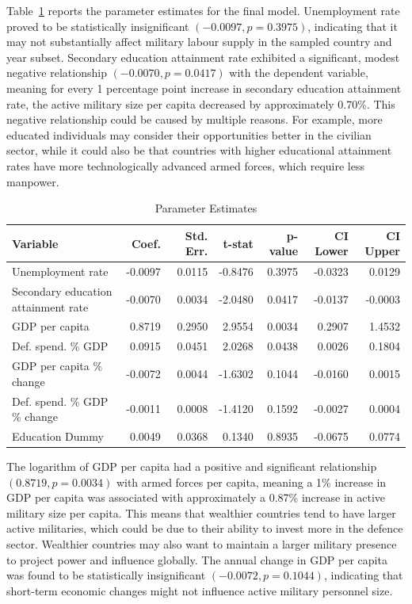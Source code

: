 Table~\ref{tab:final_model} reports the parameter estimates for the final model. 
Unemployment rate proved to be statistically insignificant $(-0.0097, p=0.3975)$, indicating that it may not substantially affect military labour supply in the sampled country and year subset.
Secondary education attainment rate exhibited a significant, modest negative relationship $(-0.0070, p=0.0417)$ with the dependent variable, meaning for every 1 percentage point increase in secondary education attainment rate, the active military size per capita decreased by approximately 0.70\%.
This negative relationship could be caused by multiple reasons. For example, more educated individuals may consider their opportunities better in the civilian sector, while it could also be that countries with higher educational attainment rates have more technologically advanced armed forces, which require less manpower.

\begin{table}[htbp]
\caption{Parameter Estimates}
\centering
\begin{threeparttable}
\begin{tabularx}{\textwidth}{@{}Xrrrrrr@{}}
\toprule
\textbf{Variable} & \textbf{Coef.} & \textbf{Std. Err.} & \textbf{t-stat} & \textbf{p-value} & \textbf{CI Lower} & \textbf{CI Upper} \\
\midrule
Unemployment rate & -0.0097 & 0.0115 & -0.8476 & 0.3975 & -0.0323 & 0.0129 \\
Secondary education attainment rate & -0.0070 & 0.0034 & -2.0480 & 0.0417 & -0.0137 & -0.0003 \\
GDP per capita & 0.8719 & 0.2950 & 2.9554 & 0.0034 & 0.2907 & 1.4532 \\
Def. spend. \% GDP & 0.0915 & 0.0451 & 2.0268 & 0.0438 & 0.0026 & 0.1804 \\
GDP per capita \% change & -0.0072 & 0.0044 & -1.6302 & 0.1044 & -0.0160 & 0.0015 \\
Def. spend. \% GDP \% change & -0.0011 & 0.0008 & -1.4120 & 0.1592 & -0.0027 & 0.0004 \\
Education Dummy & 0.0049 & 0.0368 & 0.1340 & 0.8935 & -0.0675 & 0.0774 \\
\bottomrule
\end{tabularx}
\end{threeparttable}
\label{tab:final_model}
\end{table}

The logarithm of GDP per capita had a positive and significant relationship $(0.8719, p=0.0034)$ with armed forces per capita, meaning a 1\% increase in GDP per capita was associated with approximately a 0.87\% increase in active military size per capita. 
This means that wealthier countries tend to have larger active militaries, which could be due to their ability to invest more in the defence sector. 
Wealthier countries may also want to maintain a larger military presence to project power and influence globally.
The annual change in GDP per capita was found to be statistically insignificant $(-0.0072, p=0.1044)$, indicating that short-term economic changes might not influence active military personnel size. 

